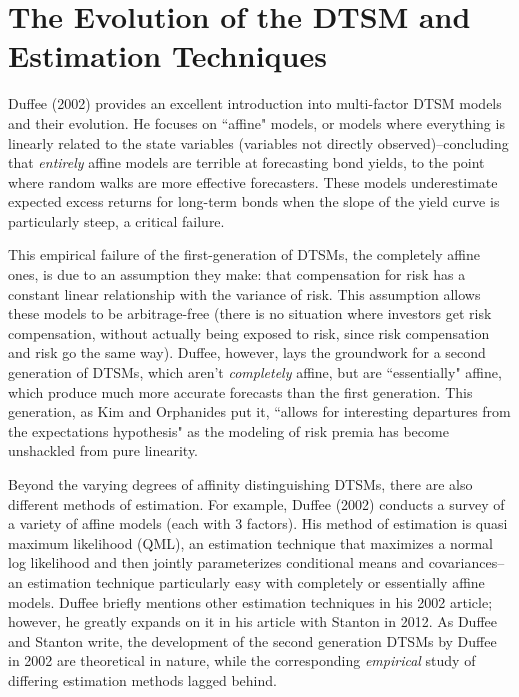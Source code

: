 \documentclass[12pt,final]{article}
\begin{document}
\section{The Evolution of the DTSM and Estimation Techniques}

Duffee (2002) provides an excellent introduction into multi-factor DTSM models and their evolution. \citep{Duffee2002} He focuses on ``affine" models, or models where everything is linearly related to the state variables (variables not directly observed)--concluding that \textit{entirely} affine models are terrible at forecasting bond yields, to the point where random walks are more effective forecasters. These models underestimate expected excess returns for long-term bonds when the slope of the yield curve is particularly steep, a critical failure. 

This empirical failure of the first-generation of DTSMs, the completely affine ones, is due to an assumption they make: that compensation for risk has a constant linear relationship with the variance of risk. This assumption allows these models to be arbitrage-free (there is no situation where investors get risk compensation, without actually being exposed to risk, since risk compensation and risk go the same way). Duffee, however, lays the groundwork for a second generation of DTSMs, which aren't \textit{completely} affine, but are ``essentially" affine, which produce much more accurate forecasts than the first generation. This generation, as Kim and Orphanides put it, ``allows for interesting departures from the expectations hypothesis" as the modeling of risk premia has become unshackled from pure linearity. \citep{Kim2012}

Beyond the varying degrees of affinity distinguishing DTSMs, there are also different methods of estimation. For example, Duffee (2002) conducts a survey of a variety of affine models (each with 3 factors). His method of estimation is quasi maximum likelihood (QML), an estimation technique that maximizes a normal log likelihood and then jointly parameterizes conditional means and covariances--an estimation technique particularly easy with completely or essentially affine models. \citep{Bollerslev1992} Duffee briefly mentions other estimation techniques in his 2002 article; however, he greatly expands on it in his article with Stanton in 2012. \citep{Duffee2012} As Duffee and Stanton write, the development of the second generation DTSMs by Duffee in 2002 are theoretical in nature, while the corresponding \textit{empirical} study of differing estimation methods lagged behind.
\end{document}

